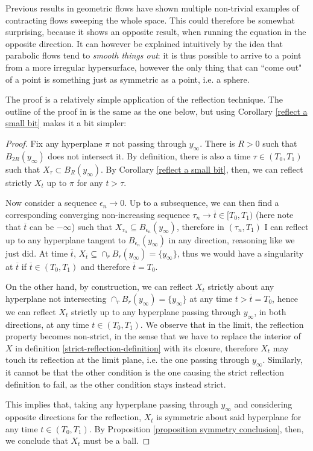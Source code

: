 Previous results in geometric flows have shown multiple non-trivial examples of contracting flows sweeping the whole space.
This could therefore be somewhat surprising, because it shows an opposite result, when running the equation in the opposite direction. It can however be explained intuitively by the idea that parabolic flows tend to \textit{smooth things out}: it is thus possible to arrive to a point from a more irregular hypersurface, however the only thing that can ``come out" of a point is something just as symmetric as a point, i.e. a sphere. 

The proof is a relatively simple application of the reflection technique. The outline of the proof in \cite{SinestRisa} is the same as the one below, but using Corollary \ref{reflect a small bit} makes it a bit simpler: 

\begin{proof}
	Fix any hyperplane $\pi$ not passing through $y_\infty$. There is $R>0$ such that $B_{2R}(y_\infty)$ does not intersect it. By definition, there is also a time  $\tau \in  (T_0, T_1)$ such that $X_\tau \subset B_R(y_\infty)$. 
	By Corollary \ref{reflect a small bit}, then, we can reflect strictly $X_t$ up to $\pi$ for any $t>\tau$. 
	
	Now consider a sequence  $\epsilon_n\rightarrow 0$. Up to a subsequence, we can then find a corresponding converging non-increasing sequence $\tau_n\rightarrow \overline{t}\in [T_0, T_1)$ (here note that $\overline{t}$ can be $-\infty$) such that $X_{\tau_n}\subseteq B_{\epsilon_n}(y_\infty)$, therefore in $(\tau_n, T_1)$ I can reflect up to any hyperplane tangent to  $B_{\epsilon_n}(y_\infty)$ in any direction, reasoning like we just did. At time $\overline{t}$, $X_{\overline{t}} \subseteq \cap_r B_{r}(y_\infty) = \{y_\infty\}$, thus we would have a singularity at $\overline{t}$ if  $\overline{t}\in(T_0, T_1)$ and therefore $\overline{t}=T_0$. 
	
	On the other hand, by construction, we can reflect $X_{t}$ strictly about any hyperplane not intersecting $\cap_r B_{r}(y_\infty) = \{y_\infty\}$ at any time $t>\overline{t}=T_0$, hence we can reflect $X_{t}$ strictly up to any hyperplane passing through $y_\infty$, in both directions, at any  time $t\in (T_0, T_1)$. We observe that in the limit, the reflection property becomes non-strict, in the sense that we have to replace the interior of $X$ in definition \ref{strict-reflection-definition} with its closure, therefore $X_{t}$ may touch its reflection at the limit plane, i.e. the one passing through $y_\infty$. Similarly, it cannot be that the other condition is the one causing the strict reflection definition to fail, as the other condition stays instead strict. 
	
	This implies that, taking any hyperplane passing through $y_\infty$ and considering opposite directions for the reflection, $X_{t}$ is symmetric about said hyperplane for any time $t\in (T_0, T_1)$. By Proposition \ref{proposition symmetry conclusion}, then, we conclude that $X_{t}$ must be a ball.	
\end{proof}



